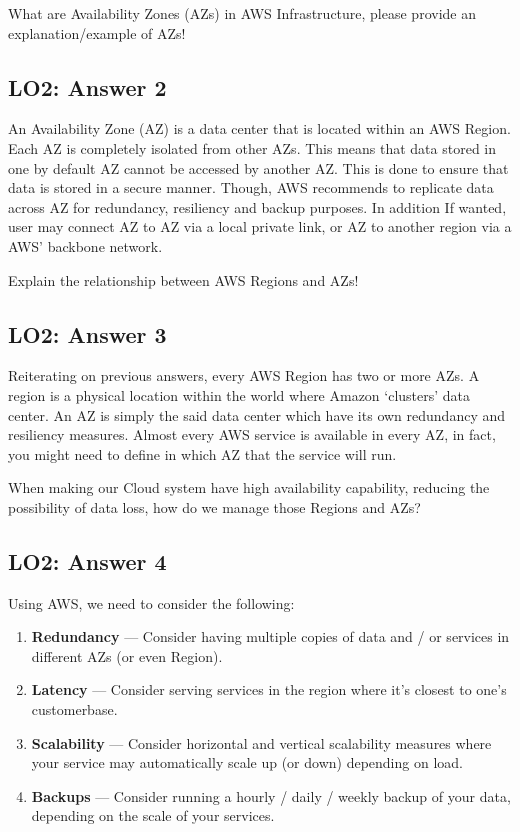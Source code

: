 \documentclass[
  11pt, %
]{assignment}
\begin{document}
\begin{problem}
What are Availability Zones (AZs) in AWS Infrastructure, please provide an explanation/example of AZs!
\end{problem}

\subsection*{LO2: Answer 2}

An Availability Zone (AZ) is a data center that is located within an AWS Region. Each AZ is completely isolated from other AZs. This means that data stored in one by default AZ cannot be accessed by another AZ\@. This is done to ensure that data is stored in a secure manner. Though, AWS recommends to replicate data across AZ for redundancy, resiliency and backup purposes. In addition If wanted, user may connect AZ to AZ via a local private link, or AZ to another region via a AWS' backbone network.

\begin{problem}
Explain the relationship between AWS Regions and AZs!
\end{problem}

\subsection*{LO2: Answer 3}

Reiterating on previous answers, every AWS Region has two or more AZs. A region is a physical location within the world where Amazon `clusters' data center. An AZ is simply the said data center which have its own redundancy and resiliency measures. Almost every AWS service is available in every AZ, in fact, you might need to define in which AZ that the service will run.

\begin{problem}
When making our Cloud system have high availability capability, reducing the possibility of data loss, how do we manage those Regions and AZs?
\end{problem}

\subsection*{LO2: Answer 4}

Using AWS, we need to consider the following:

\begin{enumerate}
	\item \textbf{Redundancy} --- Consider having multiple copies of data and / or services in different AZs (or even Region).
	\item \textbf{Latency} --- Consider serving services in the region where it's closest to one's customerbase.
	\item \textbf{Scalability} --- Consider horizontal and vertical scalability measures where your service may automatically scale up (or down) depending on load.
	\item \textbf{Backups} --- Consider running a hourly / daily / weekly backup of your data, depending on the scale of your services.
\end{enumerate}
\end{document}
